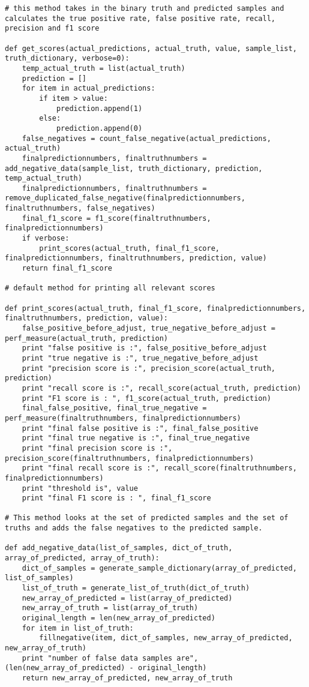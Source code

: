 \documentclass{article}
\begin{document}
\begin{verbatim}
# this method takes in the binary truth and predicted samples and calculates the true positive rate, false positive rate, recall, precision and f1 score
	
def get_scores(actual_predictions, actual_truth, value, sample_list, truth_dictionary, verbose=0):
    temp_actual_truth = list(actual_truth)
    prediction = []
    for item in actual_predictions:
        if item > value:
            prediction.append(1)
        else:
            prediction.append(0)
    false_negatives = count_false_negative(actual_predictions, actual_truth)
    finalpredictionnumbers, finaltruthnumbers = add_negative_data(sample_list, truth_dictionary, prediction, temp_actual_truth)
    finalpredictionnumbers, finaltruthnumbers = remove_duplicated_false_negative(finalpredictionnumbers, finaltruthnumbers, false_negatives)
    final_f1_score = f1_score(finaltruthnumbers, finalpredictionnumbers)
    if verbose:
        print_scores(actual_truth, final_f1_score, finalpredictionnumbers, finaltruthnumbers, prediction, value)
    return final_f1_score

# default method for printing all relevant scores
	
def print_scores(actual_truth, final_f1_score, finalpredictionnumbers, finaltruthnumbers, prediction, value):
    false_positive_before_adjust, true_negative_before_adjust = perf_measure(actual_truth, prediction)
    print "false positive is :", false_positive_before_adjust
    print "true negative is :", true_negative_before_adjust
    print "precision score is :", precision_score(actual_truth, prediction)
    print "recall score is :", recall_score(actual_truth, prediction)
    print "F1 score is : ", f1_score(actual_truth, prediction)
    final_false_positive, final_true_negative = perf_measure(finaltruthnumbers, finalpredictionnumbers)
    print "final false positive is :", final_false_positive
    print "final true negative is :", final_true_negative
    print "final precision score is :", precision_score(finaltruthnumbers, finalpredictionnumbers)
    print "final recall score is :", recall_score(finaltruthnumbers, finalpredictionnumbers)
    print "threshold is", value
    print "final F1 score is : ", final_f1_score

# This method looks at the set of predicted samples and the set of truths and adds the false negatives to the predicted sample.
	
def add_negative_data(list_of_samples, dict_of_truth, array_of_predicted, array_of_truth):
    dict_of_samples = generate_sample_dictionary(array_of_predicted, list_of_samples)
    list_of_truth = generate_list_of_truth(dict_of_truth)
    new_array_of_predicted = list(array_of_predicted)
    new_array_of_truth = list(array_of_truth)
    original_length = len(new_array_of_predicted)
    for item in list_of_truth:
        fillnegative(item, dict_of_samples, new_array_of_predicted, new_array_of_truth)
    print "number of false data samples are", (len(new_array_of_predicted) - original_length)
    return new_array_of_predicted, new_array_of_truth


\end{verbatim}
\end{document}
